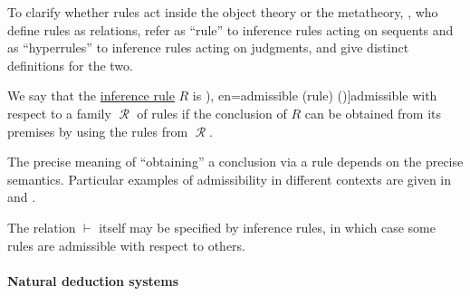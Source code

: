 \begin{remark}
  To clarify whether rules act inside the object theory or the metatheory, , who define rules as relations, refer as \enquote{rule} to inference rules acting on sequents and as \enquote{hyperrules} to inference rules acting on judgments, and give distinct definitions for the two.
\end{remark}

\begin{concept}\label{con:inference_rule_admissibility}\mimprovised
  We say that the \hyperref[def:inference_rule]{inference rule} \( R \) is \term[ru=допустимое (правило) (\cite[252]{Герасимов2011}), en=admissible (rule) (\cite[76]{TroelstraSchwichtenberg2000})]{admissible} with respect to a family \( \mscrR \) of rules if the conclusion of \( R \) can be obtained from its premises by using the rules from \( \mscrR \).
\end{concept}
\begin{comments}
  \item The precise meaning of \enquote{obtaining} a conclusion via a rule depends on the precise semantics. Particular examples of admissibility in different contexts are given in  and .

  \item The relation \( {\vdash} \) itself may be specified by inference rules, in which case some rules are admissible with respect to others.
\end{comments}

\paragraph{Natural deduction systems}

